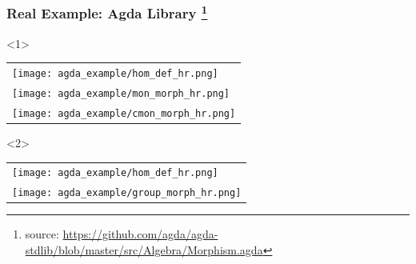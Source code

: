 \documentclass[t,12pt,numbers,fleqn,usenames,xcolor=dvipsnames]{beamer}
\begin{document}

		

\begin{frame}
\frametitle{Real Example: Agda Library
\footnote{\tiny{ source: 
\url{https://github.com/agda/agda-stdlib/blob/master/src/Algebra/Morphism.agda}}}}
\begin{onlyenv}<1>
	\begin{tabular}{l}	
		\texttt{[image: agda\_example/hom\_def\_hr.png]}\\		
		\texttt{[image: agda\_example/mon\_morph\_hr.png]}\\
		\texttt{[image: agda\_example/cmon\_morph\_hr.png]}\\		
	\end{tabular}	
\end{onlyenv}
\begin{onlyenv}<2>
	\begin{tabular}{l}	
		\texttt{[image: agda\_example/hom\_def\_hr.png]}\\		
		\texttt{[image: agda\_example/group\_morph\_hr.png]}	
	\end{tabular}	
\end{onlyenv}		
\end{frame}
\end{document}
